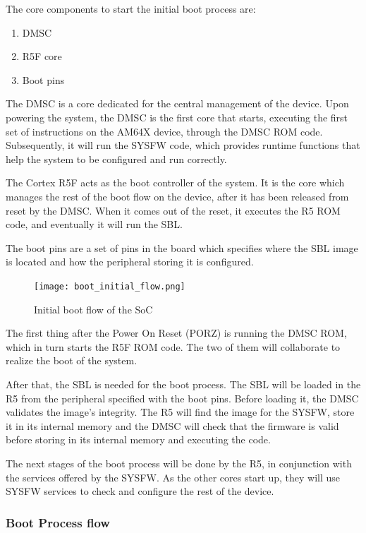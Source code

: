 The core components to start the initial boot process are:

\begin{enumerate}
    \item   DMSC
    \item   R5F core
    \item   Boot pins
\end{enumerate}

The DMSC is a core dedicated for the central management of the device.
\cite{Technical_reference_AM64}
Upon powering the system, the DMSC is the first core that starts, executing 
the first set of instructions on the AM64X device, through the DMSC ROM code.
Subsequently, it will run the SYSFW code, which provides runtime functions that
help the system to be configured and run correctly.

The Cortex R5F acts as the boot controller of the system.
It is the core which manages the rest of the boot flow on the device, after it
has been released from reset by the DMSC. When it comes out of the reset, it
executes the R5 ROM code, and eventually it will run the SBL.

The boot pins are a set of pins in the board which specifies where the SBL
image is located and how the peripheral storing it is configured. 

\begin{figure}[ht]
    \centering
    \texttt{[image: boot\_initial\_flow.png]}
    \caption{Initial boot flow of the SoC}
\end{figure}

The first thing after the Power On Reset (PORZ) is running the DMSC ROM, which
in turn starts the R5F ROM code. The two of them will collaborate to realize
the boot of the system.

After that, the SBL is needed for the boot process. The SBL will be loaded in
the R5 from the peripheral specified with the boot pins.
Before loading it, the DMSC validates the image's integrity. 
The R5 will find the image for the SYSFW, store it in its internal memory and
the DMSC will check that the firmware is valid before storing in its internal
memory and executing the code.

The next stages of the boot process will be done by the R5, in conjunction with
the services offered by the SYSFW. As the other cores start up, they will use
SYSFW services to check and configure the rest of the device.

\subsubsection{Boot Process flow}

